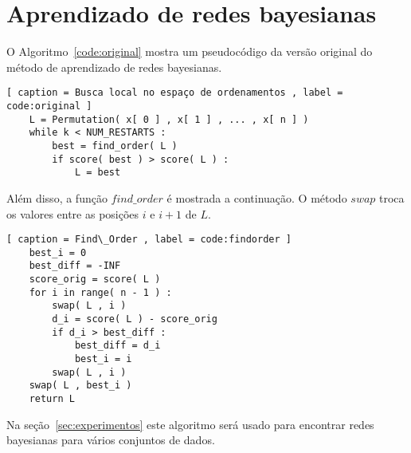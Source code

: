 \section{Aprendizado de redes bayesianas}
\label{sec:aprendizado}

O Algoritmo~\ref{code:original} mostra um pseudocódigo da versão original do método de aprendizado de redes bayesianas.

\begin{lstlisting}[ caption = Busca local no espaço de ordenamentos , label = code:original ]
	L = Permutation( x[ 0 ] , x[ 1 ] , ... , x[ n ] )
	while k < NUM_RESTARTS :
		best = find_order( L )
		if score( best ) > score( L ) :
			L = best
\end{lstlisting}

Além disso, a função ${find\_order}$ é mostrada a continuação. O método ${swap}$ troca os valores entre as posições $i$ e ${i+1}$ de $L$.

\begin{lstlisting}[ caption = Find\_Order , label = code:findorder ]
	best_i = 0
	best_diff = -INF
	score_orig = score( L )
	for i in range( n - 1 ) :
		swap( L , i )
		d_i = score( L ) - score_orig
		if d_i > best_diff :
			best_diff = d_i
			best_i = i
		swap( L , i )
	swap( L , best_i )
	return L
\end{lstlisting}

Na seção~\ref{sec:experimentos} este algoritmo será usado para encontrar redes bayesianas para vários conjuntos de dados.